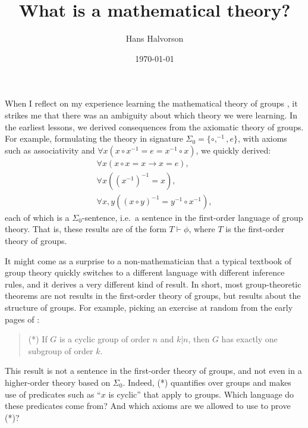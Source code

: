 \documentclass[12pt,fleqn]{article}
\title{What is a mathematical theory?}
\author{Hans Halvorson}
\date{\today}
\begin{document}
\maketitle






When I reflect on my experience learning the mathematical theory of
groups \citep[see][]{hungerford}, it strikes me that there was an
ambiguity about which theory we were learning. In the earliest
lessons, we derived consequences from the axiomatic theory of
groups. For example, formulating the theory in signature
$\Sigma _0=\{ \circ ,^{-1},e\}$, with axioms such as associativity and
$\forall x(x\circ x^{-1}=e=x^{-1}\circ x)$, we quickly derived:
\[ \begin{array}{ll}
     \forall x(x\circ x=x\to x=e ) ,\\
     \forall x((x^{-1})^{-1}=x), \\
     \forall x,y((x\circ y)^{-1}=y^{-1}\circ x^{-1}) ,\end{array}
\]
each of which is a $\Sigma _0$-sentence, i.e.\ a sentence in the
first-order language of group theory. That is, these results are of
the form $T\vdash\phi$, where $T$ is the first-order theory of groups.

It might come as a surprise to a non-mathematician that a typical
textbook of group theory quickly switches to a different language with
different inference rules, and it derives a very different kind of
result. In short, most group-theoretic theorems are not results in the
first-order theory of groups, but results about the structure of
groups. For example, picking an exercise at random from the early
pages of \citep{hungerford}:
\begin{quote} (*) If $G$ is a cyclic group of order $n$ and $k|n$,
  then $G$ has exactly one subgroup of order $k$. \end{quote} This
result is not a sentence in the first-order theory of groups, and not
even in a higher-order theory based on $\Sigma _0$. Indeed, (*)
quantifies over groups and makes use of predicates such as ``$x$ is
cyclic'' that apply to groups. Which language do these predicates come
from? And which axioms are we allowed to use to prove (*)?
\end{document}
